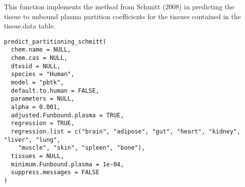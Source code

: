 \documentclass[a4paper]{book}
\begin{document}
%
\begin{Description}\relax
This function implements the method from Schmitt (2008) in predicting the 
tissue to unbound plasma partition coefficients for the tissues contained 
in the tissue.data table.
\end{Description}
%
\begin{Usage}
\begin{verbatim}
predict_partitioning_schmitt(
  chem.name = NULL,
  chem.cas = NULL,
  dtxsid = NULL,
  species = "Human",
  model = "pbtk",
  default.to.human = FALSE,
  parameters = NULL,
  alpha = 0.001,
  adjusted.Funbound.plasma = TRUE,
  regression = TRUE,
  regression.list = c("brain", "adipose", "gut", "heart", "kidney", "liver", "lung",
    "muscle", "skin", "spleen", "bone"),
  tissues = NULL,
  minimum.Funbound.plasma = 1e-04,
  suppress.messages = FALSE
)
\end{verbatim}
\end{Usage}
%
\end{document}
